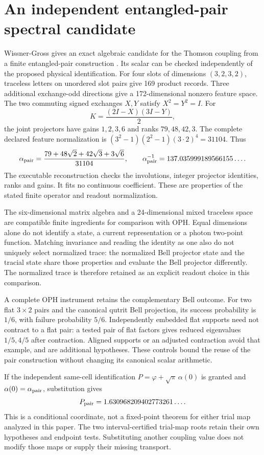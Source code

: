 \section{An independent entangled-pair spectral candidate}
\label{sec:entangled-pair-alpha}

Wissner-Gross gives an exact algebraic candidate for the Thomson coupling
from a finite entangled-pair construction \cite{wissnergross2026pairs}.
Its scalar can be checked independently of the proposed physical
identification. For four slots of dimensions \((3,2,3,2)\), traceless
letters on unordered slot pairs give 169 product records. Three additional
exchange-odd directions give a 172-dimensional nonzero feature space.
The two commuting signed exchanges \(X,Y\) satisfy \(X^2=Y^2=I\). For
\[
 K=\frac{(2I-X)(3I-Y)}2,
\]
the joint projectors have gains \(1,2,3,6\) and ranks \(79,48,42,3\).
The complete declared feature normalization is
\((3^2-1)(2^2-1)(3\cdot2)^4=31104\). Thus
\[
 \alpha_{\rm pair}
 =\frac{79+48\sqrt2+42\sqrt3+3\sqrt6}{31104},\qquad
 \alpha_{\rm pair}^{-1}=137.035999189566155\ldots.
\]
The executable reconstruction checks the involutions, integer projector
identities, ranks and gains. It fits no continuous coefficient. These are
properties of the stated finite operator and readout normalization.

The six-dimensional matrix algebra and a 24-dimensional mixed traceless
space are compatible finite ingredients for comparison with OPH. Equal
dimensions alone do not identify a state, a current representation or a
photon two-point function. Matching invariance and reading the identity as
one also do not uniquely select normalized trace: the normalized Bell
projector state and the tracial state share those properties and evaluate
the Bell projector differently. The normalized trace is therefore retained
as an explicit readout choice in this comparison.

A complete OPH instrument retains the complementary Bell outcome. For two
flat \(3\times2\) pairs and the canonical qutrit Bell projection, its
success probability is \(1/6\), with failure probability \(5/6\).
Independently embedded flat supports need not contract to a flat pair: a
tested pair of flat factors gives reduced eigenvalues \(1/5,4/5\) after
contraction. Aligned supports or an adjusted contraction avoid that example,
and are additional hypotheses. These controls bound the reuse of the pair
construction without changing its canonical scalar arithmetic.

If the independent same-cell identification
\(P=\varphi+\sqrt\pi\,\alpha(0)\) is granted and
\(\alpha(0)=\alpha_{\rm pair}\), substitution gives
\[
 P_{\rm pair}=1.630968209402773261\ldots.
\]
This is a conditional coordinate, not a fixed-point theorem for either
trial map analyzed in this paper. The two interval-certified trial-map
roots retain their own hypotheses and endpoint tests. Substituting another
coupling value does not modify those maps or supply their missing transport.

